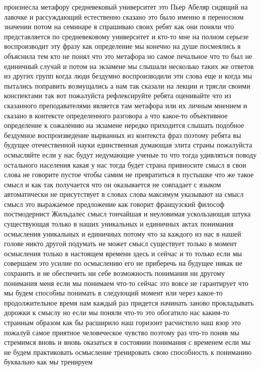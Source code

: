 произнесла метафору средневековый университет это Пьер Абеляр сидящий на лавочке
и рассуждающий естественно сказано это было именно в переносном значении потом
на семинаре я спрашиваю своих ребят как они поняли что представляется по
средневековому университет и кто-то мне на полном серьезе воспроизводит эту
фразу как определение мы конечно на душе посмеялись я объяснила тем кто не понял
что это метафора но самое печальное что то был не единичный случай и потом на
экзамене мы слышали несколько таких же ответов из других групп когда люди
бездумно воспроизводили эти слова еще и когда мы пытались поправить возмущались
а нам так сказали на лекции и трясли своими конспектами так вот пожалуйста
рефлексируйте ребята оценивайте что из сказанного преподавателями является там
метафора или их личным мнением и сказано в контексте определенного разговора а
что какое-то объективное определение к сожалению на экзамене нередко приходится
слышать подобное бездумное воспроизведение вырванных из контекста фраз поэтому
ребята вы будущее отечественной науки единственная думающая элита страны
пожалуйста осмысляйте если у нас будут недумающие ученые то что тогда удивляться
поводу остального населения какая у нас тогда будет страна привносите смысл в
свои слова не говорите пустое чтобы самим не превратиться в пустышке что же
такое смысл и как так получается что он оказывается не совпадает с языком
автоматически не присутствует в словах слова максимум указывают на смысл смысл
это выражаемое предложение как говорит французский философ постмодернист
Жильдалес смысл тончайшая и неуловимая ускользающая штука существующая только в
наших уникальных и единичных актах понимания осмысления уникальных и единичных
потому что за каждого из нас в нашей голове никто другой подумать не может смысл
существует только в момент осмысления только в настоящем времени здесь и сейчас
и то только если мы совершаем это усилие по осмыслению его не приберечь на
будущее никак не сохранить и не обеспечить ни себе возможность понимания ни
другому понимания меня если мы понимаем что-то сейчас это вовсе не гарантирует
что мы будем способны понимать в следующий момент или через какое-то
продолжительное время нам каждый раз придется начинать заново прокладывать
дорожки к смыслу но если мы поняли что-то это обогатило нас каким-то странным
образом как бы расширило наш горизонт расчистило наш взор это пожалуй самое
приятное человеческое чувство поэтому раз что-то поняв мы стремимся вновь и
вновь оказаться в состоянии понимания с временем если мы не будем практиковать
осмысление тренировать свою способность к пониманию буквально как мы тренируем
